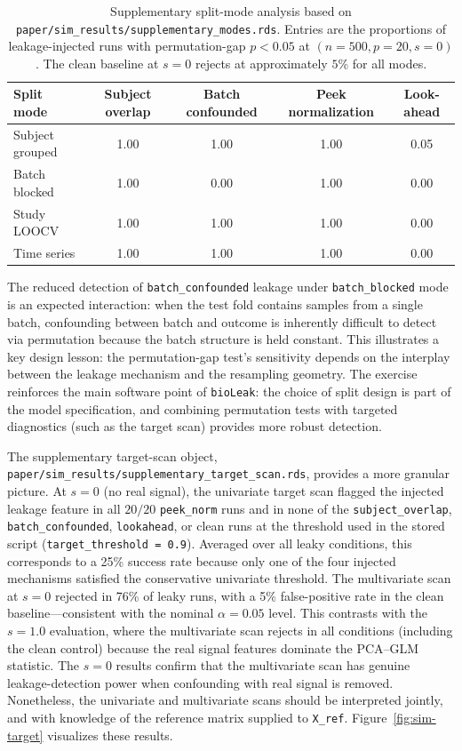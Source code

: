 \documentclass[article]{jss}
\begin{document}
\begin{table}[tbp]
\centering
\caption{Supplementary split-mode analysis based on
\texttt{paper/sim\_results/supplementary\_modes.rds}. Entries are the
proportions of leakage-injected runs with permutation-gap $p < 0.05$ at
$(n = 500, p = 20, s = 0)$. The clean baseline at $s = 0$ rejects at
approximately $5\%$ for all modes.}
\label{tab:sim-modes}
\begin{tabular}{|l|c|c|c|c|}
\hline
\textbf{Split mode} & \textbf{Subject overlap} & \textbf{Batch confounded} & \textbf{Peek normalization} & \textbf{Look-ahead} \\
\hline
Subject grouped & 1.00 & 1.00 & 1.00 & 0.05 \\
\hline
Batch blocked & 1.00 & 0.00 & 1.00 & 0.00 \\
\hline
Study LOOCV & 1.00 & 1.00 & 1.00 & 0.00 \\
\hline
Time series & 1.00 & 1.00 & 1.00 & 0.00 \\
\hline
\end{tabular}
\end{table}

The reduced detection of \texttt{batch\_confounded} leakage under
\texttt{batch\_blocked} mode is an expected interaction: when the test fold
contains samples from a single batch, confounding between batch and outcome is
inherently difficult to detect via permutation because the batch structure is
held constant. This illustrates a key design lesson: the permutation-gap test's
sensitivity depends on the interplay between the leakage mechanism and the
resampling geometry. The exercise reinforces the main software point of
\texttt{bioLeak}: the choice of split design is part of the model
specification, and combining permutation tests with targeted diagnostics
(such as the target scan) provides more robust detection.

The supplementary target-scan object,
\texttt{paper/sim\_results/supplementary\_target\_scan.rds}, provides a more
granular picture. At $s = 0$ (no real signal), the univariate target scan
flagged the injected leakage feature in all $20/20$ \texttt{peek\_norm} runs
and in none of the \texttt{subject\_overlap}, \texttt{batch\_confounded},
\texttt{lookahead}, or clean runs at the threshold used in the stored script
(\texttt{target\_threshold = 0.9}). Averaged over all leaky conditions, this
corresponds to a 25\% success rate because only one of the four
injected mechanisms satisfied the conservative univariate threshold. The
multivariate scan at $s = 0$ rejected in 76\% of leaky runs, with
a 5\% false-positive rate in the clean baseline---consistent with
the nominal $\alpha = 0.05$ level. This contrasts with the $s = 1.0$
evaluation, where the multivariate scan rejects in all conditions (including
the clean control) because the real signal features dominate the PCA--GLM
statistic. The $s = 0$ results confirm that the multivariate scan has genuine
leakage-detection power when confounding with real signal is removed.
Nonetheless, the univariate and multivariate scans should be interpreted
jointly, and with knowledge of the reference matrix supplied to
\texttt{X\_ref}. Figure~\ref{fig:sim-target} visualizes these results.
\end{document}
